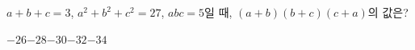 $a+b+c=3$, $a^2+b^2+c^2=27$, $abc=5$일 때, $(a+b)(b+c)(c+a)$의 값은?
\begin{choices32}{$-26$}{$-28$}{$-30$}{$-32$}{$-34$}\end{choices32}
